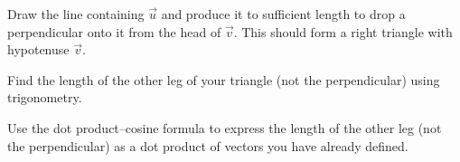 \documentclass[12pt]{exam}
\begin{document}
\begin{questions}

\question Draw the line containing $\vec{u}$ and produce it to sufficient length to drop a perpendicular onto it from the head of $\vec{v}$. This should form a right triangle with hypotenuse $\vec{v}$.


\question Find the length of the other leg of your triangle (not the perpendicular) using trigonometry.


\question Use the dot product--cosine formula to express the length of the other leg (not the perpendicular) as a dot product of vectors you have already defined.



\end{questions} 
\end{document}
